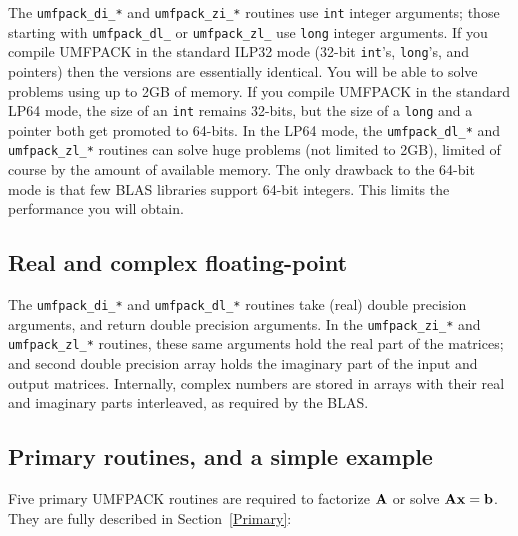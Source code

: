 The {\tt umfpack\_di\_*} and {\tt umfpack\_zi\_*} routines use {\tt int} integer
arguments; those starting with {\tt umfpack\_dl\_} or {\tt umfpack\_zl\_}
use {\tt long} integer arguments.  If you compile UMFPACK in the standard
ILP32 mode (32-bit {\tt int}'s, {\tt long}'s, and pointers) then the versions
are essentially identical.  You will be able to solve problems using up to 2GB
of memory.  If you compile UMFPACK in the standard LP64 mode, the size of an
{\tt int} remains 32-bits, but the size of a {\tt long} and a pointer both get
promoted to 64-bits.  In the LP64 mode, the {\tt umfpack\_dl\_*}
and {\tt umfpack\_zl\_*} routines can solve huge
problems (not limited to 2GB), limited of course by the amount of available
memory.  The only drawback to the 64-bit mode is that few BLAS libraries
support 64-bit integers.  This limits the performance you will obtain.

\subsection{Real and complex floating-point}

The {\tt umfpack\_di\_*} and {\tt umfpack\_dl\_*} routines take (real) double
precision arguments, and return double precision arguments.  In the
{\tt umfpack\_zi\_*} and {\tt umfpack\_zl\_*} routines, these same arguments
hold the real part of the matrices; and second double precision array holds
the imaginary part of the input and output matrices.  Internally, complex
numbers are stored in arrays with their real and imaginary parts interleaved,
as required by the BLAS.

\subsection{Primary routines, and a simple example}

Five primary UMFPACK routines are required to factorize ${\bf{A}}$ or
solve ${\bf{Ax}}={\bf{b}}$.  They are fully described in Section~\ref{Primary}:


